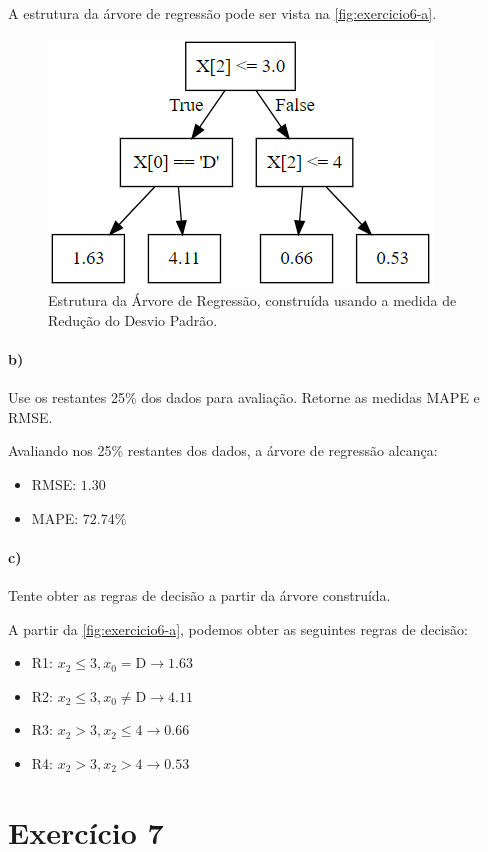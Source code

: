 \documentclass{article}
\begin{document}
A estrutura da árvore de regressão pode ser vista na \autoref{fig:exercicio6-a}.

\begin{figure}[h]
	\centering
	\includegraphics[width=0.5\linewidth]{exercicio6-a.png}
	\caption{Estrutura da Árvore de Regressão, construída usando a medida de Redução do Desvio Padrão.}
	\label{fig:exercicio6-a}
\end{figure}

\paragraph{b)} Use os restantes 25\% dos dados para avaliação. Retorne as medidas MAPE e RMSE.

Avaliando nos 25\% restantes dos dados, a árvore de regressão alcança:

\begin{itemize}
	\item RMSE: $1.30$
	\item MAPE: $72.74\%$
\end{itemize}

\paragraph{c)} Tente obter as regras de decisão a partir da árvore construída.

A partir da \autoref{fig:exercicio6-a}, podemos obter as seguintes regras de decisão:

\begin{itemize}
	\item R1: $x_2 \leq 3, x_0 = \text{D} \rightarrow 1.63$
	\item R2: $x_2 \leq 3, x_0 \neq \text{D} \rightarrow 4.11$
	\item R3: $x_2 > 3, x_2 \leq 4 \rightarrow 0.66$
	\item R4: $x_2 > 3, x_2 > 4 \rightarrow 0.53$
\end{itemize}

\section{Exercício 7}
\end{document}
